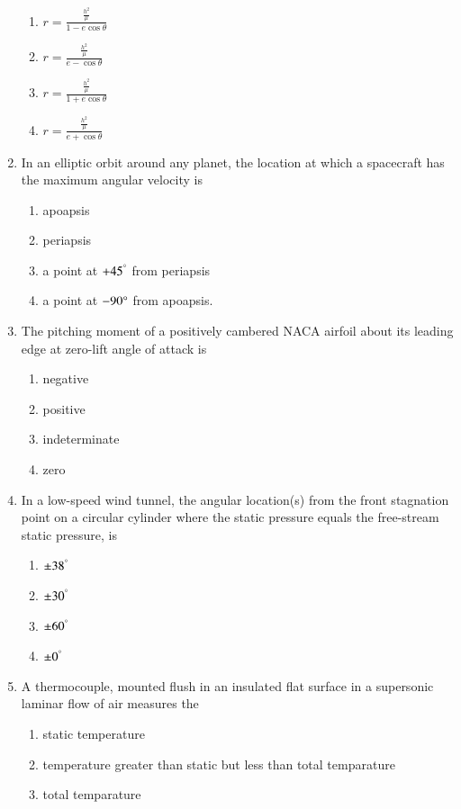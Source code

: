 \documentclass[journal,12pt,onecolumn]{IEEEtran}
\theoremstyle{remark}
\begin{document}
\begin{enumerate}
\begin{enumerate}
    \item $r=\frac{\frac{h^2}{\mu}}{1-e\cos\theta}$
     \item $r=\frac{\frac{h^2}{\mu}}{e-\cos\theta}$
    \item $r=\frac{\frac{h^2}{\mu}}{1+e\cos\theta}$
     \item $r=\frac{\frac{h^2}{\mu}}{e+\cos\theta}$
\end{enumerate}
\item In an elliptic orbit around any planet, the location at which a spacecraft has the maximum angular velocity is
\begin{enumerate}
    \item apoapsis
    \item periapsis
    \item a point at $+45^\degree$ from periapsis
    \item a point at $-90\degree$ from apoapsis.
\end{enumerate}
\item The pitching moment of a positively cambered NACA airfoil about its leading edge at zero-lift  angle of attack is
\begin{enumerate}
    \item negative
    \item positive
    \item indeterminate
    \item zero
\end{enumerate}
\item In a low-speed wind tunnel, the angular location(s) from the front stagnation point on a circular cylinder where the static pressure equals the free-stream static pressure, is
\begin{enumerate}
    \item $\pm38^\degree$
    \item $\pm30^\degree$
    \item $\pm60^\degree$
    \item $\pm0^\degree$
\end{enumerate}
\item A thermocouple, mounted flush in an insulated flat surface in a supersonic laminar flow of air measures the 
\begin{enumerate}
    \item static temperature
    \item temperature greater than static but less than total temparature
    \item total temparature

\end{enumerate}
\end{enumerate}
\end{document}
